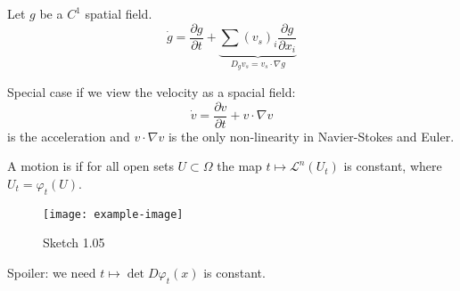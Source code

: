 \begin{theorem}\label{thm:1.16}
    Let \(g\) be a \(C^1\) spatial field.
    \[\dot{g}=\frac{\partial g}{\partial t}+\underbrace{\sum (v_s)_i\frac{\partial g}{\partial x_i}}_{D_g v_s = v_s\cdot \nabla g}\]
\end{theorem}

Special case if we view the velocity as a spacial field:
\[\dot{v}=\frac{\partial v}{\partial t}+v\cdot \nabla v\]
is the acceleration and \(v\cdot \nabla v\) is the only non-linearity in Navier-Stokes and Euler.

\begin{definition}\label{def:1.17}
    A motion is  if for all open sets \(U\subset \Omega\) the map 
    \(t\mapsto \mathcal{L}^n(U_t)\) is constant, where \(U_t=\varphi_t(U)\). 
\end{definition}

\begin{figure}[H]\label{fig:1.05}
    \centering
    \texttt{[image: example-image]}
    \caption{Sketch 1.05}
\end{figure}

Spoiler: we need \(t\mapsto \det D\varphi_t(x)\) is constant.

